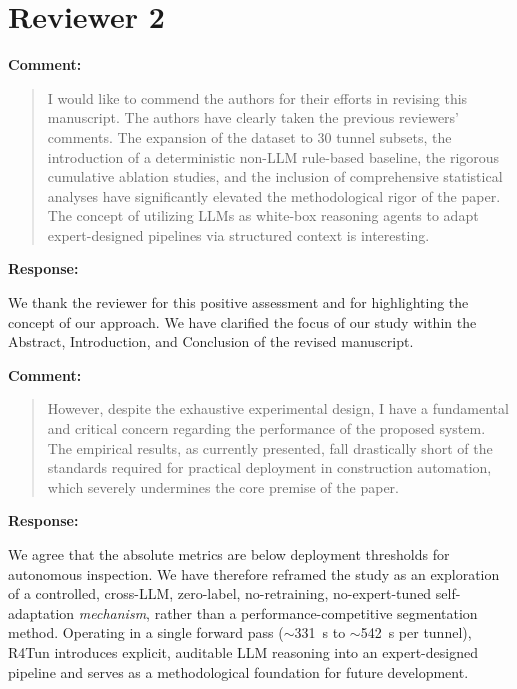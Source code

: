 \documentclass[11pt,a4paper]{article}
\newenvironment{commentblock}{%
  \par\smallskip\noindent\textbf{Comment:}\par
  \begin{quote}\itshape\color{black}
}{%
  \end{quote}\smallskip
}
\newenvironment{responseblock}{%
  \par\smallskip\noindent\textbf{Response:}\par
  \begingroup\color{responsegreen}
}{%
  \endgroup\smallskip
}
\begin{document}
\section*{Reviewer 2}

\begin{commentblock}
I would like to commend the authors for their efforts in revising this manuscript. The authors have clearly taken the previous reviewers' comments. The expansion of the dataset to 30 tunnel subsets, the introduction of a deterministic non-LLM rule-based baseline, the rigorous cumulative ablation studies, and the inclusion of comprehensive statistical analyses have significantly elevated the methodological rigor of the paper. The concept of utilizing LLMs as white-box reasoning agents to adapt expert-designed pipelines via structured context is interesting.
\end{commentblock}
\begin{responseblock}
We thank the reviewer for this positive assessment and for highlighting the concept of our approach. We have clarified the focus of our study within the Abstract, Introduction, and Conclusion of the revised manuscript.
\end{responseblock}

\begin{commentblock}
However, despite the exhaustive experimental design, I have a fundamental and critical concern regarding the performance of the proposed system. The empirical results, as currently presented, fall drastically short of the standards required for practical deployment in construction automation, which severely undermines the core premise of the paper.
\end{commentblock}
\begin{responseblock}
We agree that the absolute metrics are below deployment thresholds for autonomous inspection. We have therefore reframed the study as an exploration of a controlled, cross-LLM, zero-label, no-retraining, no-expert-tuned self-adaptation \emph{mechanism}, rather than a performance-competitive segmentation method. Operating in a single forward pass ($\sim$331~s to $\sim$542~s per tunnel), R4Tun introduces explicit, auditable LLM reasoning into an expert-designed pipeline and serves as a methodological foundation for future development.
\end{responseblock}
\end{document}
